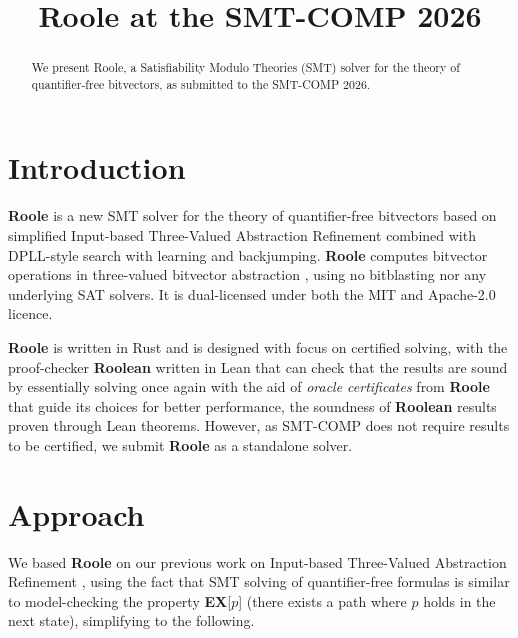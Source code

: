 \documentclass[conference]{IEEEtran}
\begin{document}
\title{Roole at the SMT-COMP 2026}

\author{
  \and
}

\maketitle

\begin{abstract}
  We present Roole, a Satisfiability Modulo Theories (SMT)
  solver for the theory of quantifier-free bitvectors,
  as submitted to the SMT-COMP 2026.
\end{abstract}

\section{Introduction}

\textbf{Roole} \cite{roole} is a new SMT solver for the theory of quantifier-free bitvectors
based on simplified Input-based Three-Valued Abstraction Refinement \cite{onderka2026}
combined with DPLL-style search with learning and backjumping.
\textbf{Roole} computes bitvector operations in three-valued bitvector abstraction \cite{onderka2022},
using no bitblasting nor any underlying SAT solvers.
It is dual-licensed under both the MIT and Apache-2.0 licence.

\textbf{Roole} is written in Rust and is designed with focus on certified solving,
with the proof-checker \textbf{Roolean} \cite{roolean}
written in Lean that can check that the results are sound by essentially solving once again
with the aid of \emph{oracle certificates} from \textbf{Roole} that guide its choices for better performance,
the soundness of \textbf{Roolean} results proven through Lean theorems.
However, as SMT-COMP does not require results to be certified, we submit \textbf{Roole} as a standalone solver.

\section{Approach}
We based \textbf{Roole} on our previous work on Input-based Three-Valued Abstraction Refinement \cite{onderka2022},
using the fact that SMT solving of quantifier-free formulas is similar to model-checking the property
\textbf{EX}[$p$] (there exists a path where $p$ holds in the next state), simplifying to the following.
\end{document}
